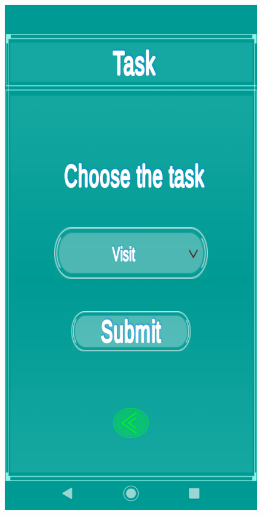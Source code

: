 \documentclass{aifyp}
\begin{document}
\begin{appendices}
\begin{figure}[H]
\begin{minipage}{.5\textwidth}
          \label{fig:UserProfile}
        \end{minipage}
\end{figure}
\begin{figure}[H]
    \centering
        \begin{minipage}{.5\textwidth}
          \centering
          \includegraphics[scale=0.2]{Images/Chapter5/Impl13.png}

\end{minipage}
\end{figure}
\end{appendices}
\end{document}

